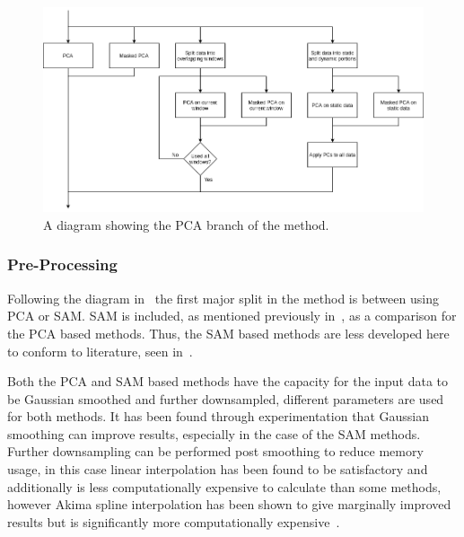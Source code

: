                 \begin{figure}
                    \centering
                    
                    \includegraphics[width=1.0\linewidth]{figures/pca_data_driven_surrogate_signal_extraction_methods_for_dynamic_pet_methods_data_driven_surrogate_signal_extraction_pca.png}
                    
                    \captionsetup{singlelinecheck=false, justification=centering}
                    \caption{A diagram showing the \gls{PCA} branch of the method.}
                    \label{fig:pca_data_driven_surrogate_signal_extraction_methods_for_dynamic_pet_methods_data_driven_surrogate_signal_extraction_pca}
                \end{figure}
                
                \subsubsection{Pre-Processing} \label{sec:pca_data_driven_surrogate_signal_extraction_methods_for_dynamic_pet_methods_pre_processing}
                    Following the diagram in~ the first major split in the method is between using \gls{PCA} or \gls{SAM}. \gls{SAM} is included, as mentioned previously in~, as a comparison for the \gls{PCA} based methods. Thus, the \gls{SAM} based methods are less developed here to conform to literature, seen in~.
                    
                    Both the \gls{PCA} and \gls{SAM} based methods have the capacity for the input data to be Gaussian smoothed and further downsampled, different parameters are used for both methods. It has been found through experimentation that Gaussian smoothing can improve results, especially in the case of the \gls{SAM} methods. Further downsampling can be performed post smoothing to reduce memory usage, in this case linear interpolation has been found to be satisfactory and additionally is less computationally expensive to calculate than some methods, however Akima spline interpolation has been shown to give marginally improved results but is significantly more computationally expensive~.
                        
